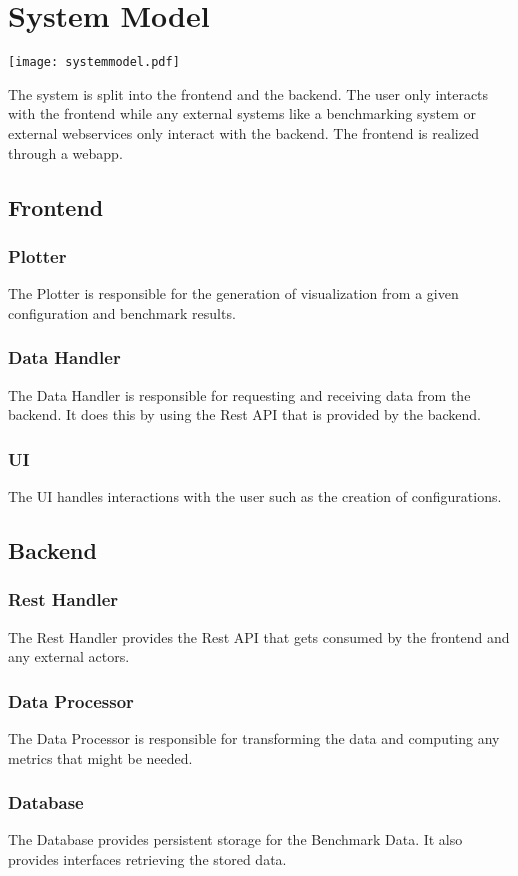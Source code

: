 \section{System Model}

\texttt{[image: systemmodel.pdf]}

The system is split into the frontend and the backend. The \gls{user} only interacts with the frontend while any external systems like a benchmarking system or external webservices only interact with the backend. The frontend is realized through a webapp.

\subsection{Frontend}

\subsubsection*{Plotter}

The Plotter is responsible for the generation of \gls{visualization} from a given \gls{configuration} and benchmark results. 

\subsubsection*{Data Handler}

The Data Handler is responsible for requesting and receiving data from the backend. It does this by using the Rest API that is provided by the backend.

\subsubsection*{UI}

The UI handles interactions with the \gls{user} such as the creation of \glspl{configuration}.

\subsection{Backend}

\subsubsection*{Rest Handler}

The Rest Handler provides the Rest API that gets consumed by the frontend and any external actors.

\subsubsection*{Data Processor}

The Data Processor is responsible for transforming the data and computing any metrics that might be needed.

\subsubsection*{Database}

The Database provides persistent storage for the Benchmark Data. It also provides interfaces retrieving the stored data.
